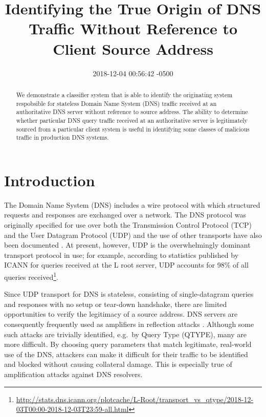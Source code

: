 \documentclass[conference]{IEEEtran}
\title{Identifying the True Origin of DNS Traffic Without Reference to Client
Source Address}
\author{\IEEEauthorblockN{Joe Abley}\IEEEauthorblockA{Western University, London, Ontario, Canada \\ Afilias Canada, Toronto, Ontario, Canada \\ \href{mailto:jabley@uwo.ca}{\nolinkurl{jabley@uwo.ca}},
\href{mailto:jabley@afilias.info}{\nolinkurl{jabley@afilias.info}}}}
\date{2018-12-04 00:56:42 -0500}
\let\citep\cite
\begin{document}
\maketitle
\begin{abstract}
We demonstrate a classifier system that is able to identify the
originating system respobsible for stateless Domain Name System (DNS)
traffic received at an authoritative DNS server without reference to
source address. The ability to determine whether particular DNS query
traffic received at an authoritative server is legitimately sourced from
a particular client system is useful in identifying some classes of
malicious traffic in production DNS systems.
\end{abstract}

\section{Introduction}\label{sec:introduction}

\label{sec:introduction}

The Domain Name System (DNS) includes a wire protocol with which
structured requests and responses are exchanged over a network. The DNS
protocol was originally specified \citep{rfc1034}\citep{rfc1035} for use
over both the Transmission Control Protocol (TCP) \citep{rfc793} and the
User Datagram Protocol (UDP) \citep{rfc768} and the use of other
transports have also been documented
\citep{rfc7858}\citep{rfc8484}\citep{huitema-quic-dnsoquic-05}. At
present, however, UDP is the overwhelmingly dominant transport protocol
in use; for example, according to statistics published by ICANN for
queries received at the L root server, UDP accounts for 98\% of all
queries
received\footnote{\url{http://stats.dns.icann.org/plotcache/L-Root/transport_vs_qtype/2018-12-03T00:00-2018-12-03T23:59-all.html}}.

Since UDP transport for DNS is stateless, consisting of single-datagram
queries and responses with no setup or tear-down handshake, there are
limited opportunities to verify the legitimacy of a source address. DNS
servers are consequently frequently used as amplifiers in reflection
attacks \citep{rfc5358}. Although some such attacks are trivially
identified, e.g.~by Query Type (QTYPE), many are more difficult. By
choosing query parameters that match legitimate, real-world use of the
DNS, attackers can make it difficult for their traffic to be identified
and blocked without causing collateral damage. This is especially true
of amplification attacks against DNS resolvers.
\end{document}
